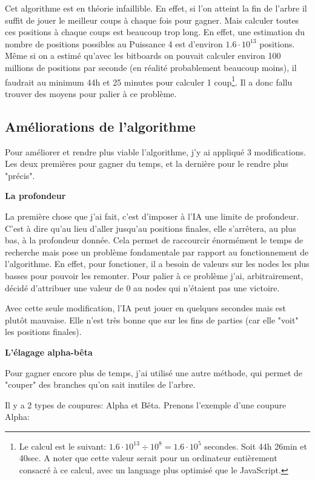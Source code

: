 \documentclass[a4paper]{article}
\newcommand{\ptitle}[1]{\vspace{10pt}
{\large \noindent \textbf{#1}}}
\begin{document}
    Cet algorithme est en théorie infaillible. En effet, si l'on atteint la fin de l'arbre il suffit de jouer le meilleur coups à chaque fois pour gagner. Mais calculer toutes ces positions à chaque coups est beaucoup trop long. En effet, une estimation du nombre de positions possibles au Puissance 4 est d'environ \textbf{$1.6\cdot10^{13}$} positions. Même si on a estimé qu'avec les bitboards on pouvait calculer environ 100 millions de positions par seconde (en réalité probablement beaucoup moins), il faudrait au minimum 44h et 25 minutes pour calculer 1 coup\footnote{Le calcul est le suivant: $1.6\cdot10^{13}\div10^{8} = 1.6\cdot10^{5}$ secondes. Soit 44h 26min et 40sec. A noter que cette valeur serait pour un ordinateur entièrement consacré à ce calcul, avec un language plus optimisé que le JavaScript.}. Il a donc fallu trouver des moyens pour palier à ce problème.

\subsection{Améliorations de l'algorithme}

    Pour améliorer et rendre plus viable l'algorithme, j'y ai appliqué 3 modifications. Les deux premières pour gagner du temps, et la dernière pour le rendre plus "précis".

    \ptitle{La profondeur}

    La première chose que j'ai fait, c'est d'imposer à l'IA une limite de profondeur. C'est à dire qu'au lieu d'aller jusqu'au positions finales, elle s'arrêtera, au plus bas, à la profondeur donnée. Cela permet de raccourcir énormément le temps de recherche mais pose un problème fondamentale par rapport au fonctionnement de l'algorithme. En effet, pour fonctioner, il a besoin de valeurs sur les nodes les plus basses pour pouvoir les remonter. Pour palier à ce problème j'ai, arbitrairement, décidé d'attribuer une valeur de 0 au nodes qui n'étaient pas une victoire.

    Avec cette seule modification, l'IA peut jouer en quelques secondes mais est plutôt mauvaise. Elle n'est très bonne que sur les fins de parties (car elle "voit" les positions finales).

    \ptitle{L'élagage alpha-bêta}

    Pour gagner encore plus de temps, j'ai utilisé une autre méthode, qui permet de "couper" des branches qu'on sait inutiles de l'arbre.

    Il y a 2 types de coupures: Alpha et Bêta. Prenons l'exemple d'une coupure Alpha: 
\end{document}
